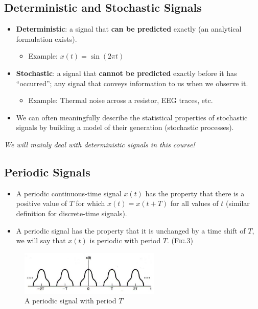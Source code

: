 \subsection{Deterministic and Stochastic Signals}
 \begin{itemize}
    \item \textbf{Deterministic}: a signal that \textbf{can be predicted} exactly (an analytical formulation exists). 
     \begin{itemize}
        \item Example: $x(t) = \sin(2\pi t)$
      \end{itemize}
      
    \item \textbf{Stochastic}: a signal that \textbf{cannot be predicted} exactly before it has “occurred”; any signal that conveys information to us when we observe it. 
      \begin{itemize}
        \item Example: Thermal noise across a resistor, EEG traces, etc.
      \end{itemize}
      
    \item We can often meaningfully describe the statistical properties of stochastic signals by building a model of their generation (stochastic processes).
 \end{itemize}
\textit{We will mainly deal with deterministic signals in this course!}

\subsection{Periodic Signals}
 \begin{itemize}
    \item A periodic continuous-time signal $x(t)$ has the property that there is a positive value of $T$ for which $x(t) = x(t+T)$ for all values of $t$ (similar definition for discrete-time signals).
    
    \item A periodic signal has the property that it is unchanged by a time shift of $T$, we will say that $x(t)$ is periodic with period $T$. (\textsc{Fig.3})
 \end{itemize}
 \begin{figure}[H]\centering
    \includegraphics[width = 0.6\textwidth]{images/1.5}
    \caption{A periodic signal with period $T$}
 \end{figure}

